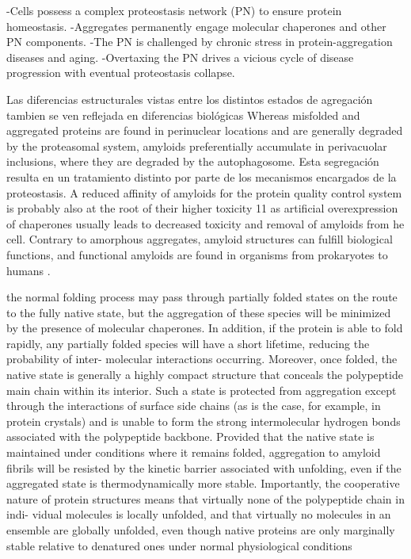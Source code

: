 -Cells possess a complex proteostasis network (PN) to ensure protein homeostasis.
-Aggregates permanently engage molecular chaperones and other PN components.
-The PN is challenged by chronic stress in protein-aggregation diseases and aging.
-Overtaxing the PN drives a vicious cycle of disease progression with eventual proteostasis collapse.



Las diferencias estructurales vistas entre los distintos estados de agregación tambien se ven reflejada en diferencias biológicas 
Whereas misfolded and aggregated proteins are found in perinuclear locations and are generally degraded by the 
proteasomal system, amyloids preferentially accumulate in perivacuolar inclusions, where they are degraded by the autophagosome.
Esta segregación resulta en un tratamiento distinto por parte de los mecanismos encargados de la proteostasis.
A reduced affinity of amyloids for the protein quality control system is probably also at the root of their higher toxicity 11 as artificial overexpression of chaperones
usually leads to decreased toxicity and removal of amyloids from he cell.
Contrary to amorphous aggregates, amyloid structures can fulfill biological functions, and functional amyloids are found in organisms from prokaryotes to humans \cite{fowler2007functional}.





the normal folding process may pass through
partially folded states on the route to the fully native state,
but the aggregation of these species will be minimized by
the presence of molecular chaperones. In addition, if the
protein is able to fold rapidly, any partially folded species
will have a short lifetime, reducing the probability of inter-
molecular interactions occurring. Moreover, once folded,
the native state is generally a highly compact structure
that conceals the polypeptide main chain within its
interior. Such a state is protected from aggregation except
through the interactions of surface side chains (as is the
case, for example, in protein crystals) and is unable to
form the strong intermolecular hydrogen bonds associated
with the polypeptide backbone. Provided that the native
state is maintained under conditions where it remains
folded, aggregation to amyloid fibrils will be resisted by
the kinetic barrier associated with unfolding, even if the
aggregated state is thermodynamically more stable.
Importantly, the cooperative nature of protein structures
means that virtually none of the polypeptide chain in indi-
vidual molecules is locally unfolded, and that virtually no
molecules in an ensemble are globally unfolded, even
though native proteins are only marginally stable relative
to denatured ones under normal physiological conditions


